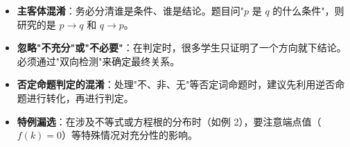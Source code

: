 \begin{trapbox}
\begin{itemize}
    \item \textbf{主客体混淆}：务必分清谁是条件、谁是结论。题目问"$p$ 是 $q$ 的什么条件"，则研究的是 $p \rightarrow q$ 和 $q \rightarrow p$。
    \item \textbf{忽略"不充分"或"不必要"}：在判定时，很多学生只证明了一个方向就下结论。必须通过"双向检测"来确定最终关系。
    \item \textbf{否定命题判定的混淆}：处理"不、非、无"等否定词命题时，建议先利用逆否命题进行转化，再进行判定。
    \item \textbf{特例漏选}：在涉及不等式或方程根的分布时（如例 2），要注意端点值（$f(k)=0$）等特殊情况对充分性的影响。
\end{itemize}
\end{trapbox}